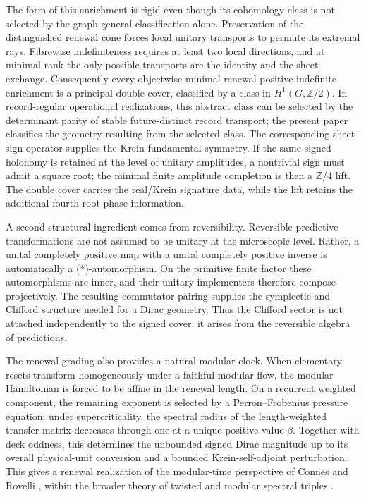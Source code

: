 \documentclass[11pt]{article}
\theoremstyle{definition}
\theoremstyle{remark}
\newcommand{\Z}{\mathbb{Z}}
\begin{document}
The form of this enrichment is rigid even though its cohomology class is not
selected by the graph-general classification alone.  Preservation of the
distinguished renewal cone forces local unitary transports to permute its
extremal rays.  Fibrewise indefiniteness requires at least two local directions,
and at minimal rank the only possible transports are the identity and the
sheet exchange.  Consequently every objectwise-minimal renewal-positive
indefinite enrichment is a principal double cover, classified by a class in
$H^1(G,\Z/2)$.  In record-regular operational realizations, this abstract class
can be selected by the determinant parity of stable future-distinct record
transport; the present paper classifies the geometry resulting from the
selected class.  The corresponding sheet-sign operator supplies the Krein
fundamental symmetry.  If the same signed holonomy is retained at the level
of unitary amplitudes, a nontrivial sign must admit a square root; the minimal
finite amplitude completion is then a $\Z/4$ lift.  The double cover carries
the real/Krein signature data, while the lift retains the additional
fourth-root phase information.

A second structural ingredient comes from reversibility.  Reversible
predictive transformations are not assumed to be unitary at the microscopic
level.  Rather, a unital completely positive map with a unital completely
positive inverse is automatically a (*)-automorphism.  On the primitive
finite factor these automorphisms are inner, and their unitary implementers
therefore compose projectively.  The resulting commutator pairing supplies
the symplectic and Clifford structure needed for a Dirac geometry.  Thus the
Clifford sector is not attached independently to the signed cover: it arises
from the reversible algebra of predictions.

The renewal grading also provides a natural modular clock.  When elementary
resets transform homogeneously under a faithful modular flow, the modular
Hamiltonian is forced to be affine in the renewal length.  On a recurrent
weighted component, the remaining exponent is selected by a Perron--Frobenius
pressure equation: under supercriticality, the spectral radius of the
length-weighted transfer matrix decreases through one at a unique positive
value $\beta$.  Together with deck oddness, this determines the unbounded
signed Dirac magnitude up to its overall physical-unit conversion and a
bounded Krein-self-adjoint perturbation.  This gives a renewal realization of
the modular-time perspective of Connes and Rovelli
\cite{connesrovelli1994}, within the broader theory of twisted and modular
spectral triples
\cite{connes-moscovici,careyphillipsrennie2010,
careyneshveyevnestrennie2011}.
\end{document}
